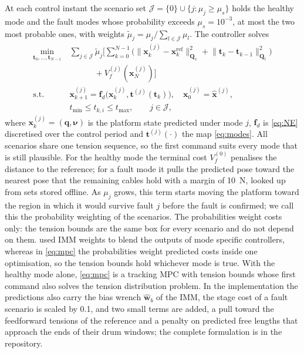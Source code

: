 \documentclass{interact}
\newcommand{\vc}[1]{\bm{#1}}
\newcommand{\mt}[1]{\mathbf{#1}}
\begin{document}
At each control instant the scenario set $\mathcal J=\{0\}\cup\{j:\mu_j\ge\mu_s\}$ holds the healthy mode and the fault modes whose probability exceeds $\mu_s=10^{-3}$, at most the two most probable ones, with weights $\tilde\mu_j=\mu_j/\sum_{l\in\mathcal J}\mu_l$. The controller solves
\begin{equation}\label{eq:mpc}
\begin{aligned}
\min_{\vc t_0,\dots,\vc t_{N-1}}\ &\sum_{j\in\mathcal J}\tilde\mu_j\Big[\sum_{k=0}^{N-1}\big(\lVert\vc x^{(j)}_k-\vc x^{\mathrm{ref}}_k\rVert^2_{\mt Q_x}+\lVert\vc t_k-\vc t_{k-1}\rVert^2_{\mt Q_t}\big)\\
&\qquad\quad+V_f^{(j)}(\vc x^{(j)}_N)\Big]\\
\text{s.t.}\ &\vc x^{(j)}_{k+1}=\vc f_d\big(\vc x^{(j)}_k,\vc t^{(j)}(\vc t_k)\big),\quad\vc x^{(j)}_0=\hat{\vc x}^{(j)},\\
&t_{\min}\le t_{k,i}\le t_{\max},\qquad j\in\mathcal J,
\end{aligned}
\end{equation}
where $\vc x^{(j)}_k=(\vc q,\vc\nu)$ is the platform state predicted under mode $j$, $\vc f_d$ is \eqref{eq:NE} discretised over the control period and $\vc t^{(j)}(\cdot)$ the map \eqref{eq:modes}. All scenarios share one tension sequence, so the first command suits every mode that is still plausible. For the healthy mode the terminal cost $V_f^{(0)}$ penalises the distance to the reference; for a fault mode it pulls the predicted pose toward the nearest pose that the remaining cables hold with a margin of 10~N, looked up from sets stored offline. As $\mu_j$ grows, this term starts moving the platform toward the region in which it would survive fault $j$ before the fault is confirmed; we call this the probability weighting of the scenarios. The probabilities weight costs only: the tension bounds are the same box for every scenario and do not depend on them. \citet{raman2023cable} used IMM weights to blend the outputs of mode specific controllers, whereas in \eqref{eq:mpc} the probabilities weight predicted costs inside one optimisation, so the tension bounds hold whichever mode is true. With the healthy mode alone, \eqref{eq:mpc} is a tracking MPC with tension bounds whose first command also solves the tension distribution problem. In the implementation the predictions also carry the bias wrench $\hat{\vc w}_b$ of the IMM, the stage cost of a fault scenario is scaled by 0.1, and two small terms are added, a pull toward the feedforward tensions of the reference and a penalty on predicted free lengths that approach the ends of their drum windows; the complete formulation is in the repository.
\end{document}
